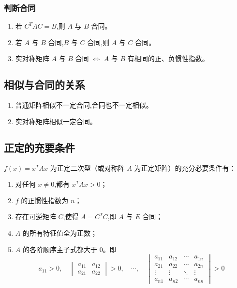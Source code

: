 \documentclass[UTF8]{ctexart}
\theoremstyle{remark}
\begin{document}
	\subsubsection{判断合同}
	\begin{enumerate}
		\item 若 \(C^TAC = B\),则 \(A\) 与 \(B\) 合同。
		\item 若 \(A\) 与 \(B\) 合同,\(B\) 与 \(C\) 合同,则 \(A\) 与 \(C\) 合同。
		\item 实对称矩阵 \(A\) 与 \(B\) 合同 \(\Leftrightarrow\) \(A\) 与 \(B\) 有相同的正、负惯性指数。
	\end{enumerate}
	
	\subsection{相似与合同的关系}
	\begin{enumerate}
		\item 普通矩阵相似不一定合同,合同也不一定相似。
		\item 实对称矩阵相似一定合同。
	\end{enumerate}
	
	\subsection{正定的充要条件}
	\(f(x) = x^TAx\) 为正定二次型（或对称阵 \(A\) 为正定矩阵）的充分必要条件有：
	\begin{enumerate}
		\item 对任何 \(x \neq 0\),都有 \(x^TAx > 0\)；
		\item \(f\) 的正惯性指数为 \(n\)；
		\item 存在可逆矩阵 \(C\),使得 \(A = C^TC\),即 \(A\) 与 \(E\) 合同；
		\item \(A\) 的所有特征值全为正数；
		\item \(A\) 的各阶顺序主子式都大于 \(0\)。即
		\[
		a_{11} > 0, \quad 
		\begin{vmatrix}
			a_{11} & a_{12} \\
			a_{21} & a_{22}
		\end{vmatrix} > 0, \quad \cdots, \quad
		\begin{vmatrix}
			a_{11} & a_{12} & \cdots & a_{1n} \\
			a_{21} & a_{22} & \cdots & a_{2n} \\
			\vdots & \vdots & \ddots & \vdots \\
			a_{n1} & a_{n2} & \cdots & a_{nn}
		\end{vmatrix} > 0
		\]
	\end{enumerate}
	
\end{document}
